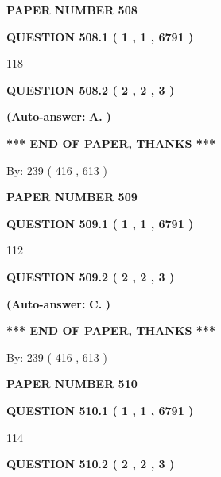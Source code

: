 \documentclass{ctexart}
\begin{document}
   
\newpage 
\setcounter{page}{ 
   508001 } 
   
   
 {\textbf{ \Large{ PAPER NUMBER  508  }}}
   
   
   
   
  
  
{\textbf{\large{QUESTION
508.1 
 ( 1 , 1 , 6791 )
}}}

118
  
  
{\textbf{\large{QUESTION
508.2 
 ( 2 , 2 , 3 )
}}}
 
 
{\textbf{(Auto-answer:}}
{\textbf{\large{
A.}}}
{\textbf{)}}
 
 
   
   
   
   
\vspace{1.0in} 
{\textbf{\large{ *** END OF PAPER, THANKS *** }}} 
   
   
\hspace{1.0in} By: 
 239 ( 416 ,  613 )
   
   
   
   
\newpage 
\setcounter{page}{ 
   509001 } 
   
   
 {\textbf{ \Large{ PAPER NUMBER  509  }}}
   
   
   
   
  
  
{\textbf{\large{QUESTION
509.1 
 ( 1 , 1 , 6791 )
}}}

112
  
  
{\textbf{\large{QUESTION
509.2 
 ( 2 , 2 , 3 )
}}}
 
 
{\textbf{(Auto-answer:}}
{\textbf{\large{
C.}}}
{\textbf{)}}
 
 
   
   
   
   
\vspace{1.0in} 
{\textbf{\large{ *** END OF PAPER, THANKS *** }}} 
   
   
\hspace{1.0in} By: 
 239 ( 416 ,  613 )
   
   
   
   
\newpage 
\setcounter{page}{ 
   510001 } 
   
   
 {\textbf{ \Large{ PAPER NUMBER  510  }}}
   
   
   
   
  
  
{\textbf{\large{QUESTION
510.1 
 ( 1 , 1 , 6791 )
}}}

114
  
  
{\textbf{\large{QUESTION
510.2 
 ( 2 , 2 , 3 )
}}}
 
\end{document}
